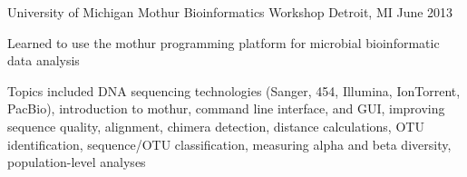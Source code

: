 \begin{cventries}
  \cventry
    {University of Michigan} %
    {Mothur Bioinformatics Workshop} %
    {Detroit, MI} %
    {June 2013} %
    {
      \begin{cvitems} %
        \item {Learned to use the mothur programming platform for microbial bioinformatic data analysis}
        \item {Topics included DNA sequencing technologies (Sanger, 454, Illumina, IonTorrent, PacBio), introduction to mothur, command line interface, and GUI, improving sequence quality, alignment, chimera detection, distance calculations, OTU identification, sequence/OTU classification, measuring alpha and beta diversity, population-level analyses}
      \end{cvitems}
    }



\end{cventries}

